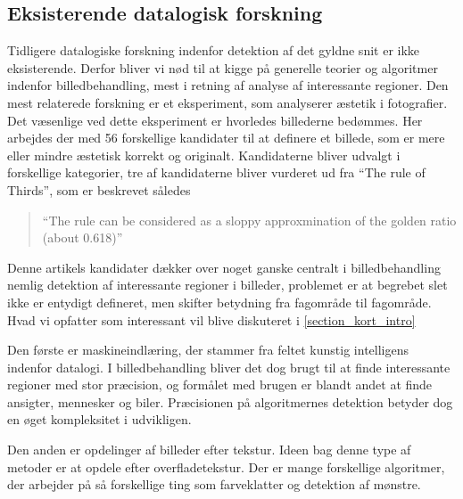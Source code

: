 {\subsection{Eksisterende datalogisk forskning}
Tidligere datalogiske forskning indenfor detektion af det gyldne snit er
ikke eksisterende. Derfor bliver vi nød til at kigge på generelle teorier og algoritmer
indenfor billedbehandling, mest i retning af  analyse af interessante
regioner. Den mest relaterede forskning er et eksperiment, som
analyserer æstetik i fotografier\cite{DattaWang}.
Det væsenlige ved dette eksperiment er hvorledes billederne
bedømmes. Her arbejdes der med 56 forskellige kandidater til at definere
et billede, som er mere eller mindre æstetisk korrekt og originalt. 
Kandidaterne bliver udvalgt i forskellige kategorier, tre af
kandidaterne bliver vurderet ud fra ``The rule of Thirds'', som er 
beskrevet således
\begin{quote}
	``The rule can be considered as a sloppy approxmination of the
	golden ratio (about 0.618)''
\end{quote}

Denne artikels kandidater dækker over noget ganske centralt i
billedbehandling nemlig detektion af
interessante regioner i billeder, problemet er at begrebet slet ikke er
entydigt defineret, men skifter betydning fra fagområde til fagområde.
Hvad vi opfatter som interessant vil blive diskuteret i \ref{section_kort_intro}

Den første er maskineindlæring, der stammer fra feltet kunstig
intelligens indenfor datalogi. I billedbehandling bliver det dog
brugt til at finde interessante regioner med stor præcision, og formålet
med brugen er blandt andet at finde ansigter, mennesker og
biler\cite{ViolaJones01,SchneidermanKanade00,Gabor}. Præcisionen på
algoritmernes detektion betyder dog en øget kompleksitet i udvikligen. 

Den anden er opdelinger af billeder efter tekstur. Ideen bag denne type
af metoder er at opdele efter
overfladetekstur\cite{218442,CarsonBelongie02,PapageorgiouPoggio}.
Der er mange forskellige algoritmer, der arbejder på så forskellige ting
som farveklatter og detektion af mønstre\cite{PalPal}.

}
